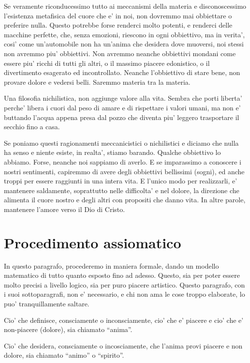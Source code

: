 Se veramente riconducessimo tutto ai meccanismi della materia e disconoscessimo l'esistenza metafisica del cuore che e' in noi, non dovremmo mai obbiettare o preferire nulla. 
Questo potrebbe forse renderci molto potenti, e renderci delle macchine perfette, che, senza emozioni, riescono in ogni obbiettivo, ma in verita', cosi' come un'automobile non ha un'anima che desidera dove muoversi, noi stessi non avremmo piu' obbiettivi. Non avremmo neanche obbiettivi mondani come essere piu' ricchi di tutti gli altri, o il massimo piacere edonistico, o il divertimento esagerato ed incontrollato. Neanche l'obbiettivo di stare bene, non provare dolore e vedersi belli. Saremmo materia tra la materia.

Una filosofia nichilistica, non aggiunge valore alla vita. Sembra che porti liberta' perche' libera i cuori dal peso di amare e di rispettare i valori umani, ma non e' buttando l'acqua appena presa dal pozzo che diventa piu' leggero trasportare il secchio fino a casa.

Se poniamo questi ragionamenti meccanicistici o nichilistici e diciamo che nulla ha senso e niente esiste, in realta', stiamo barando. Qualche obbiettivo lo abbiamo. Forse, neanche noi sappiamo di averlo. E se imparassimo a conoscere i nostri sentimenti, capiremmo di avere degli obbiettivi bellissimi (sogni), ed anche troppi per essere raggiunti in una intera vita. E l'unico modo per realizzarli, e' mantenere saldamente, soprattutto nelle difficolta' e nel dolore, la direzione che alimenta il cuore nostro e degli altri con propositi che danno vita. In altre parole, mantenere l'amore verso il Dio di Cristo.


\section{Procedimento assiomatico}
\label{procAx}

In questo paragrafo, procederemo in maniera formale, dando un modello matematico di tutto quanto esposto fino ad adesso. Questo, sia per poter essere molto precisi a livello logico, sia per puro piacere artistico. Questo paragrafo, con i suoi sottoparagrafi, non e' necessario, e chi non ama le cose troppo elaborate, lo puo' tranquillamente saltare.

Cio' che definisce, consciamente o inconsciamente, cio' che e' piacere e cio' che e' non-piacere (dolore), sia chiamato ``anima''.

Cio' che desidera, consciamente o incosciamente, che l'anima provi piacere e non dolore, sia chiamato ``animo'' o ``spirito''.

